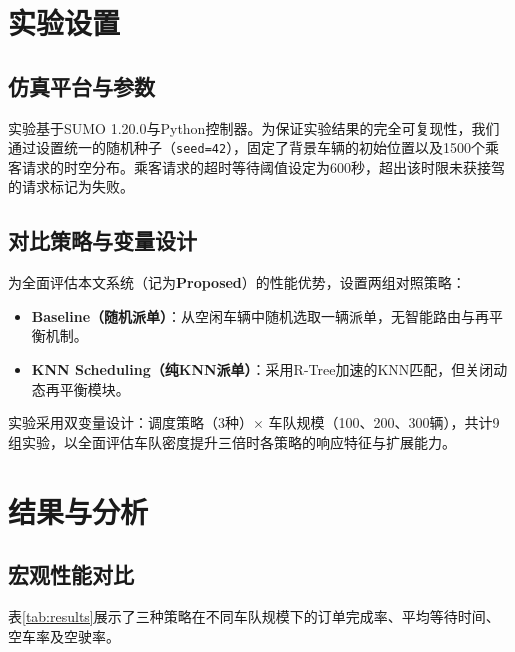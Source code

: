 \documentclass[conference]{IEEEtran}
\begin{document}
\section{实验设置}

\subsection{仿真平台与参数}
实验基于SUMO 1.20.0与Python控制器。为保证实验结果的完全可复现性，我们通过设置统一的随机种子（\texttt{seed=42}），固定了背景车辆的初始位置以及1500个乘客请求的时空分布。乘客请求的超时等待阈值设定为600秒，超出该时限未获接驾的请求标记为失败。

\subsection{对比策略与变量设计}
为全面评估本文系统（记为\textbf{Proposed}）的性能优势，设置两组对照策略：
\begin{itemize}
    \item \textbf{Baseline（随机派单）}：从空闲车辆中随机选取一辆派单，无智能路由与再平衡机制。
    \item \textbf{KNN Scheduling（纯KNN派单）}：采用R-Tree加速的KNN匹配，但关闭动态再平衡模块。
\end{itemize}
实验采用双变量设计：调度策略（3种）\(\times\) 车队规模（100、200、300辆），共计9组实验，以全面评估车队密度提升三倍时各策略的响应特征与扩展能力。

\section{结果与分析}

\subsection{宏观性能对比}
表\ref{tab:results}展示了三种策略在不同车队规模下的订单完成率、平均等待时间、空车率及空驶率。
\end{document}
